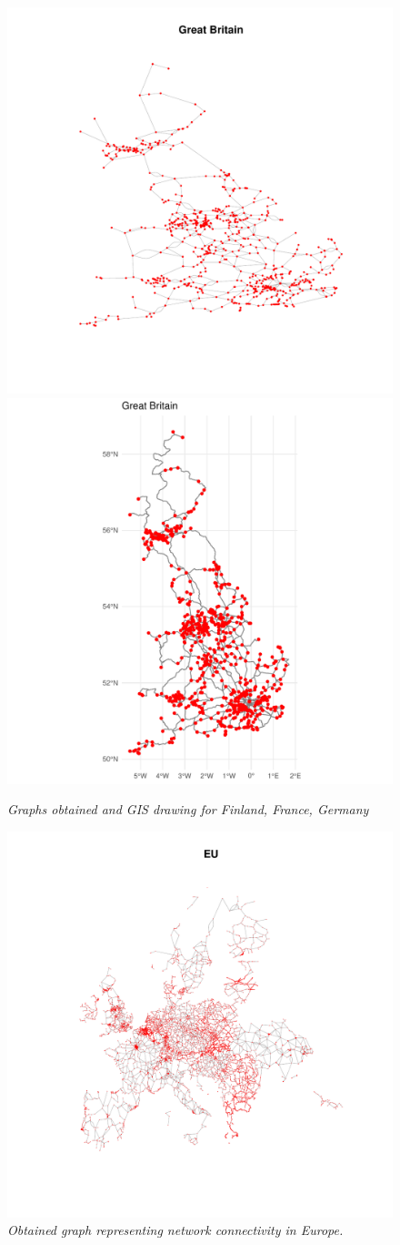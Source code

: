 \begin{figure}
	\includegraphics[width=0.34\linewidth]{images/GBGraph.pdf}
	\includegraphics[width=0.34\linewidth]{images/GBReal.pdf}
	\vspace{-5pt}
	\caption{\textit{Graphs obtained and GIS drawing for Finland, France, Germany}}
	\label{fig:country}
\end{figure}

\begin{figure}
	\centering
	\includegraphics[scale = 1]{images/Eu.pdf}
	\caption{\textit{Obtained graph representing network connectivity in Europe. }}
	\label{fig:EU}
\end{figure}

